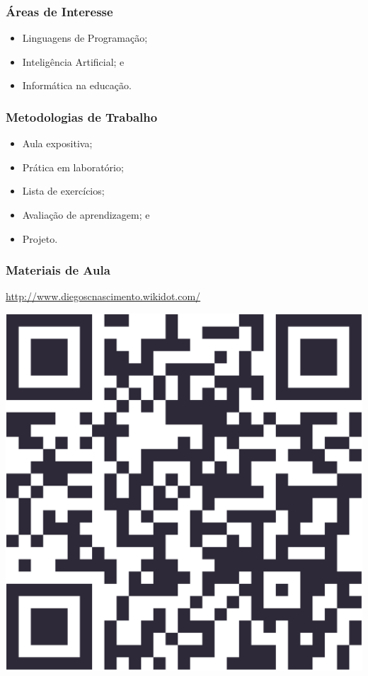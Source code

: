 \documentclass[aspectratio=169]{beamer}
\begin{document}
\begin{frame}
	\frametitle{Áreas de Interesse}
	
	\begin{itemize}
        		\item Linguagens de Programação;
		\item Inteligência Artificial; e
		\item Informática na educa\c cão.
	\end{itemize}
\end{frame}

\begin{frame}
	\frametitle{Metodologias de Trabalho}
	
	\begin{itemize}
		\item Aula expositiva;
		\item Prática em laboratório;
		\item Lista de exercícios;
	    	\item Avalia\c cão de aprendizagem; e 
		\item Projeto.
	\end{itemize}
\end{frame}

\begin{frame}
	\frametitle{Materiais de Aula}

\center
	\url{http://www.diegoscnascimento.wikidot.com/} \vfill

	\includegraphics[scale=0.05]{imagens/qrcode}
\end{frame}
\end{document}
